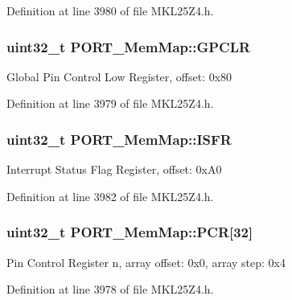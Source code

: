 Definition at line 3980 of file M\+K\+L25\+Z4.\+h.

\subsubsection[{\texorpdfstring{G\+P\+C\+LR}{GPCLR}}]{\setlength{\rightskip}{0pt plus 5cm}uint32\+\_\+t P\+O\+R\+T\+\_\+\+Mem\+Map\+::\+G\+P\+C\+LR}\hypertarget{struct_p_o_r_t___mem_map_a837c289643f8cec958b1f01c086b558a}{}\label{struct_p_o_r_t___mem_map_a837c289643f8cec958b1f01c086b558a}
Global Pin Control Low Register, offset\+: 0x80 

Definition at line 3979 of file M\+K\+L25\+Z4.\+h.

\subsubsection[{\texorpdfstring{I\+S\+FR}{ISFR}}]{\setlength{\rightskip}{0pt plus 5cm}uint32\+\_\+t P\+O\+R\+T\+\_\+\+Mem\+Map\+::\+I\+S\+FR}\hypertarget{struct_p_o_r_t___mem_map_a53c86a08f430dc915a312efe74ba83e6}{}\label{struct_p_o_r_t___mem_map_a53c86a08f430dc915a312efe74ba83e6}
Interrupt Status Flag Register, offset\+: 0x\+A0 

Definition at line 3982 of file M\+K\+L25\+Z4.\+h.

\subsubsection[{\texorpdfstring{P\+CR}{PCR}}]{\setlength{\rightskip}{0pt plus 5cm}uint32\+\_\+t P\+O\+R\+T\+\_\+\+Mem\+Map\+::\+P\+CR\mbox{[}32\mbox{]}}\hypertarget{struct_p_o_r_t___mem_map_a1c54a8f1741fade8daf28198fee43ddd}{}\label{struct_p_o_r_t___mem_map_a1c54a8f1741fade8daf28198fee43ddd}
Pin Control Register n, array offset\+: 0x0, array step\+: 0x4 

Definition at line 3978 of file M\+K\+L25\+Z4.\+h.

